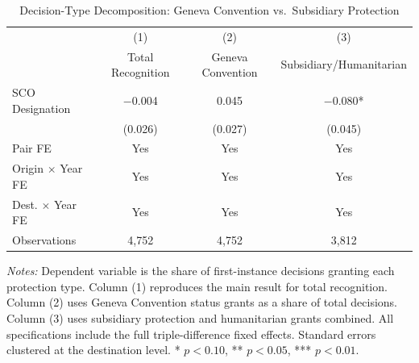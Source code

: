 \begin{table}[H]
\centering
\caption{Decision-Type Decomposition: Geneva Convention vs.\ Subsidiary Protection}
\begin{threeparttable}
\begin{tabular}{lccc}
\toprule
 & (1) & (2) & (3) \\
 & Total Recognition & Geneva Convention & Subsidiary/Humanitarian \\
\midrule
SCO Designation & $-$0.004 & 0.045 & $-$0.080* \\
 & (0.026) & (0.027) & (0.045) \\[0.5em]
\midrule
Pair FE & Yes & Yes & Yes \\
Origin $\times$ Year FE & Yes & Yes & Yes \\
Dest. $\times$ Year FE & Yes & Yes & Yes \\[0.3em]
Observations & 4,752 & 4,752 & 3,812 \\
\bottomrule
\end{tabular}
\begin{tablenotes}[flushleft]
\small
\item \textit{Notes:} Dependent variable is the share of first-instance decisions granting each protection type. Column (1) reproduces the main result for total recognition. Column (2) uses Geneva Convention status grants as a share of total decisions. Column (3) uses subsidiary protection and humanitarian grants combined. All specifications include the full triple-difference fixed effects. Standard errors clustered at the destination level. * $p<0.10$, ** $p<0.05$, *** $p<0.01$.
\end{tablenotes}
\end{threeparttable}
\label{tab:decomp}
\end{table}
